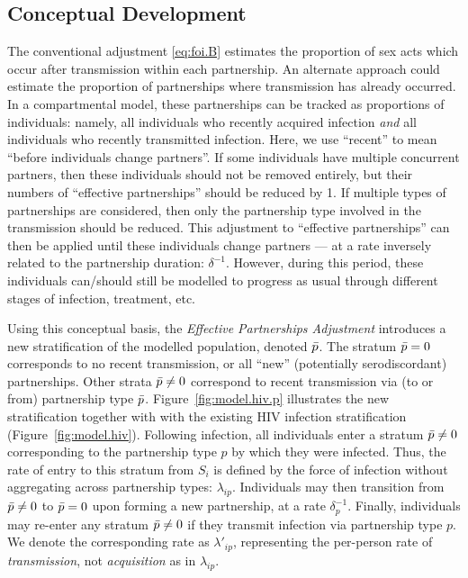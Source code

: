 \subsection{Conceptual Development}\label{foi.prop.concept}
The conventional adjustment \eqref{eq:foi.B} estimates
the proportion of sex acts which occur after transmission within each partnership.
An alternate approach could estimate
the proportion of partnerships where transmission has already occurred.
In a compartmental model, these partnerships can be tracked as proportions of individuals: namely,
all individuals who recently acquired infection \emph{and}
all individuals who recently transmitted infection.
Here, we use ``recent'' to mean ``before individuals change partners''.
If some individuals have multiple concurrent partners,
then these individuals should not be removed entirely,
but their numbers of ``effective partnerships'' should be reduced by 1.
If multiple types of partnerships are considered,
then only the partnership type involved in the transmission should be reduced.
This adjustment to ``effective partnerships'' can then be applied
until these individuals change partners
--- at a rate inversely related to the partnership duration: $\delta^{-1}$.
However, during this period, these individuals can/should still be modelled
to progress as usual through different stages of infection, treatment, etc.
\par
Using this conceptual basis, the \emph{Effective Partnerships Adjustment}
introduces a new stratification of the modelled population, denoted $\bar{p}$.
The stratum $\bar{p} = 0$ corresponds to no recent transmission,
or all ``new'' (potentially serodiscordant) partnerships.
Other strata $\bar{p} \ne 0$ correspond to recent transmission via (to or from) partnership type $\bar{p}$.
Figure~\ref{fig:model.hiv.p} illustrates the new stratification
together with with the existing HIV infection stratification (Figure~\ref{fig:model.hiv}).
Following infection, all individuals enter a stratum $\bar{p} \ne 0$
corresponding to the partnership type $p$ by which they were infected.
Thus, the rate of entry to this stratum from $S_i$ is defined by
the force of infection without aggregating across partnership types: $\lambda_{ip}$.
Individuals may then transition from $\bar{p} \ne 0$ to $\bar{p} = 0$
upon forming a new partnership, at a rate $\delta_p^{-1}$.
Finally, individuals may re-enter any stratum $\bar{p} \ne 0$
if they transmit infection via partnership type $p$.
We denote the corresponding rate as $\lambda'_{ip}$,
representing the per-person rate of \emph{transmission},
not \emph{acquisition} as in $\lambda_{ip}$.
